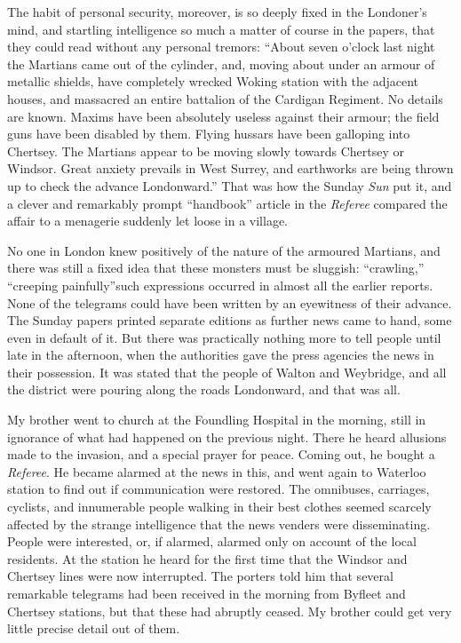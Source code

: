 The habit of personal security, moreover, is so deeply fixed in the
Londoner's mind, and startling intelligence so much a matter of
course in the papers, that they could read without any personal
tremors: ``About seven o'clock last night the Martians came out of
the cylinder, and, moving about under an armour of metallic
shields, have completely wrecked Woking station with the adjacent
houses, and massacred an entire battalion of the Cardigan Regiment.
No details are known. Maxims have been absolutely useless against
their armour; the field guns have been disabled by them. Flying
hussars have been galloping into Chertsey. The Martians appear to
be moving slowly towards Chertsey or Windsor. Great anxiety
prevails in West Surrey, and earthworks are being thrown up to
check the advance Londonward.'' That was how the Sunday \emph{Sun}
put it, and a clever and remarkably prompt ``handbook'' article in
the \emph{Referee} compared the affair to a menagerie suddenly let
loose in a village.

No one in London knew positively of the nature of the armoured
Martians, and there was still a fixed idea that these monsters must
be sluggish: ``crawling,'' ``creeping painfully''\dash{}such expressions
occurred in almost all the earlier reports. None of the telegrams
could have been written by an eyewitness of their advance. The
Sunday papers printed separate editions as further news came to
hand, some even in default of it. But there was practically nothing
more to tell people until late in the afternoon, when the
authorities gave the press agencies the news in their possession.
It was stated that the people of Walton and Weybridge, and all the
district were pouring along the roads Londonward, and that was
all.

My brother went to church at the Foundling Hospital in the morning,
still in ignorance of what had happened on the previous night.
There he heard allusions made to the invasion, and a special prayer
for peace. Coming out, he bought a \emph{Referee}. He became
alarmed at the news in this, and went again to Waterloo station to
find out if communication were restored. The omnibuses, carriages,
cyclists, and innumerable people walking in their best clothes
seemed scarcely affected by the strange intelligence that the news
venders were disseminating. People were interested, or, if alarmed,
alarmed only on account of the local residents. At the station he
heard for the first time that the Windsor and Chertsey lines were
now interrupted. The porters told him that several remarkable
telegrams had been received in the morning from Byfleet and
Chertsey stations, but that these had abruptly ceased. My brother
could get very little precise detail out of them.

